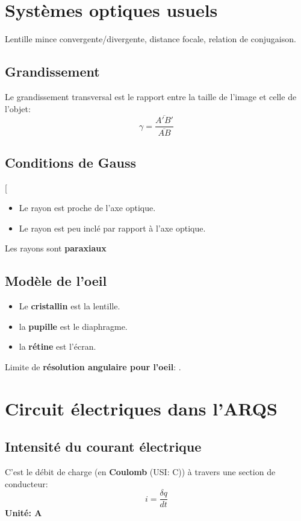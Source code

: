 \documentclass[12pt,hidelinks]{article}
\begin{document}
\section{Systèmes optiques usuels}
\vspace{3cm}
Lentille mince convergente/divergente, distance focale, relation de conjugaison.
    \subsection{Grandissement}
        Le grandissement transversal est le rapport entre la taille de l'image et celle de l'objet:
        \[ \gamma = \frac{\overline{A'B'}}{\overline{AB}}\]
	\subsection{Conditions de Gauss} 
        \begin{DashedDefinition}{}[
        \begin{itemize}
            \item Le rayon est proche de l'axe optique.
            \item Le rayon est peu inclé par rapport à l'axe optique.
        \end{itemize}
        Les rayons sont \textbf{paraxiaux}
        \end{DashedDefinition}
	\subsection{Modèle de l'oeil}
        \begin{itemize}
            \item Le \textbf{cristallin} est la lentille.
            \item la \textbf{pupille} est le diaphragme.
            \item la \textbf{rétine} est l'écran.
        \end{itemize}
        Limite de \textbf{résolution angulaire pour l'oeil}: .
\newpage
\section{Circuit électriques dans l'ARQS}
\vspace{3cm}
	\subsection{Intensité du courant électrique}
        C'est le débit de charge (en \textbf{Coulomb} (USI: C)) à travers une section de conducteur:
        \[i=\frac{\delta q}{dt}\]
        \textbf{Unité: A}
\end{document}
